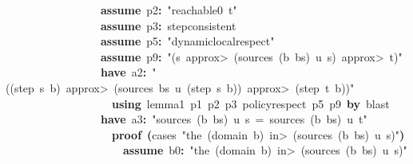 \documentclass{article}
\newcommand{\syntaxKEYWORDA}[1]{\textcolor[rgb]{0.0,0.4,0.6}{\textbf{#1}}}
\newcommand{\syntaxKEYWORDC}[1]{\textcolor[rgb]{0.0,0.6,1.0}{\textbf{#1}}}
\newcommand{\syntaxLITERALA}[1]{\textcolor[rgb]{1.0,0.0,0.8}{#1}}
\newcommand{\syntaxOPERATOR}[1]{\textcolor[rgb]{0.0,0.0,0.0}{\textbf{#1}}}
\newcommand{\syntaxKEYWORDA}[1]{\textcolor[rgb]{0.0,0.4,0.6}{\textbf{#1}}}
\newcommand{\syntaxKEYWORDC}[1]{\textcolor[rgb]{0.0,0.6,1.0}{\textbf{#1}}}
\newcommand{\syntaxLITERALA}[1]{\textcolor[rgb]{1.0,0.0,0.8}{#1}}
\newcommand{\syntaxOPERATOR}[1]{\textcolor[rgb]{0.0,0.0,0.0}{\textbf{#1}}}
\newcommand{\syntaxKEYWORDA}[1]{\textcolor[rgb]{0.0,0.4,0.6}{\textbf{#1}}}
\newcommand{\syntaxKEYWORDC}[1]{\textcolor[rgb]{0.0,0.6,1.0}{\textbf{#1}}}
\newcommand{\syntaxLITERALA}[1]{\textcolor[rgb]{1.0,0.0,0.8}{#1}}
\newcommand{\syntaxOPERATOR}[1]{\textcolor[rgb]{0.0,0.0,0.0}{\textbf{#1}}}
\newcommand{\syntaxKEYWORDA}[1]{\textcolor[rgb]{0.0,0.4,0.6}{#1}}
\newcommand{\syntaxKEYWORDC}[1]{\textcolor[rgb]{0.0,0.6,1.0}{#1}}
\newcommand{\syntaxLITERALA}[1]{\textcolor[rgb]{1.0,0.0,0.8}{\textbf{#1}}}
\newcommand{\syntaxOPERATOR}[1]{\textcolor[rgb]{0.0,0.0,0.0}{#1}}
\newcommand{\syntaxKEYWORDA}[1]{\textcolor[rgb]{0.0,0.4,0.6}{\textbf{#1}}}
\newcommand{\syntaxKEYWORDC}[1]{\textcolor[rgb]{0.0,0.6,1.0}{\textbf{#1}}}
\newcommand{\syntaxLITERALA}[1]{\textcolor[rgb]{1.0,0.0,0.8}{#1}}
\newcommand{\syntaxOPERATOR}[1]{\textcolor[rgb]{0.0,0.0,0.0}{\textbf{#1}}}
\newcommand{\syntaxKEYWORDA}[1]{\textcolor[rgb]{0.0,0.4,0.6}{\textbf{#1}}}
\newcommand{\syntaxKEYWORDC}[1]{\textcolor[rgb]{0.0,0.6,1.0}{\textbf{#1}}}
\newcommand{\syntaxLITERALA}[1]{\textcolor[rgb]{1.0,0.0,0.8}{#1}}
\newcommand{\syntaxOPERATOR}[1]{\textcolor[rgb]{0.0,0.0,0.0}{\textbf{#1}}}
\begin{document}
{\ }{\ }{\ }{\ }{\ }{\ }{\ }{\ }{\ }{\ }{\ }{\ }{\ }{\ }{\ }{\ }{\ }\syntaxKEYWORDC{assume}{\ }p2\syntaxOPERATOR{:}{\ }\syntaxLITERALA{"reachable0{\ }t"}\hspace*{\fill}\\
{\ }{\ }{\ }{\ }{\ }{\ }{\ }{\ }{\ }{\ }{\ }{\ }{\ }{\ }{\ }{\ }{\ }\syntaxKEYWORDC{assume}{\ }p3\syntaxOPERATOR{:}{\ }step\usebox{\underscorebox}consistent\hspace*{\fill}\\
{\ }{\ }{\ }{\ }{\ }{\ }{\ }{\ }{\ }{\ }{\ }{\ }{\ }{\ }{\ }{\ }{\ }\syntaxKEYWORDC{assume}{\ }p5\syntaxOPERATOR{:}{\ }\syntaxLITERALA{"dynamic\usebox{\underscorebox}local\usebox{\underscorebox}respect"}\hspace*{\fill}\\
{\ }{\ }{\ }{\ }{\ }{\ }{\ }{\ }{\ }{\ }{\ }{\ }{\ }{\ }{\ }{\ }{\ }\syntaxKEYWORDC{assume}{\ }p9\syntaxOPERATOR{:}{\ }\syntaxLITERALA{"(s{\ }\<approx>{\ }(sources{\ }(b{\ }\usebox{\hashbox}{\ }bs){\ }u{\ }s){\ }\<approx>{\ }t)"}{\ }\hspace*{\fill}\\
{\ }{\ }{\ }{\ }{\ }{\ }{\ }{\ }{\ }{\ }{\ }{\ }{\ }{\ }{\ }{\ }{\ }\syntaxKEYWORDA{have}{\ }a2\syntaxOPERATOR{:}{\ }\syntaxLITERALA{"((step{\ }s{\ }b){\ }\<approx>{\ }(sources{\ }bs{\ }u{\ }(step{\ }s{\ }b)){\ }\<approx>{\ }(step{\ }t{\ }b))"}\hspace*{\fill}\\
{\ }{\ }{\ }{\ }{\ }{\ }{\ }{\ }{\ }{\ }{\ }{\ }{\ }{\ }{\ }{\ }{\ }{\ }{\ }\syntaxKEYWORDA{using}{\ }lemma\usebox{\underscorebox}1{\ }p1{\ }p2{\ }p3{\ }policy\usebox{\underscorebox}respect{\ }p5{\ }p9{\ }\syntaxKEYWORDA{by}{\ }blast\hspace*{\fill}\\
{\ }{\ }{\ }{\ }{\ }{\ }{\ }{\ }{\ }{\ }{\ }{\ }{\ }{\ }{\ }{\ }{\ }\syntaxKEYWORDA{have}{\ }a3\syntaxOPERATOR{:}{\ }\syntaxLITERALA{"sources{\ }(b{\ }\usebox{\hashbox}{\ }bs){\ }u{\ }s{\ }={\ }sources{\ }(b{\ }\usebox{\hashbox}{\ }bs){\ }u{\ }t"}\hspace*{\fill}\\
{\ }{\ }{\ }{\ }{\ }{\ }{\ }{\ }{\ }{\ }{\ }{\ }{\ }{\ }{\ }{\ }{\ }{\ }{\ }\syntaxKEYWORDA{proof}{\ }\syntaxOPERATOR{(}cases{\ }\syntaxLITERALA{"the{\ }(domain{\ }b){\ }\<in>{\ }(sources{\ }(b{\ }\usebox{\hashbox}{\ }bs){\ }u{\ }s)"}\syntaxOPERATOR{)}\hspace*{\fill}\\
{\ }{\ }{\ }{\ }{\ }{\ }{\ }{\ }{\ }{\ }{\ }{\ }{\ }{\ }{\ }{\ }{\ }{\ }{\ }{\ }{\ }\syntaxKEYWORDC{assume}{\ }b0\syntaxOPERATOR{:}{\ }\syntaxLITERALA{"the{\ }(domain{\ }b){\ }\<in>{\ }(sources{\ }(b{\ }\usebox{\hashbox}{\ }bs){\ }u{\ }s)"}\hspace*{\fill}\\
\end{document}

